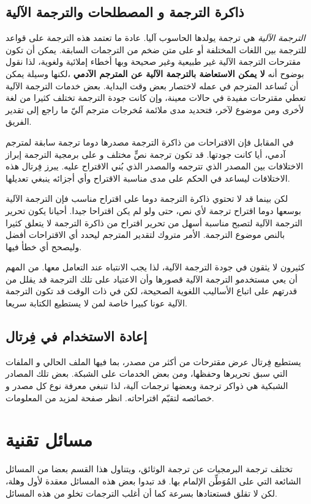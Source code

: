 \section{ذاكرة الترجمة و المصطلحات والترجمة الآلية}
{\it الترجمة الآلية} هي ترجمة يولدها الحاسوب آليا. عادة ما تعتمد هذه
الترجمة على قواعد للترجمة بين اللغات المختلفة أو على متن ضخم من
الترجمات السابقة. يمكن أن تكون مقترحات الترجمة الآلية غير طبيعية وغير
صحيحة وبها أخطاء إملائية ولغوية، لذا نقول بوضوح أنه {\bf لا يمكن
الاستعاضة بالترجمة الآلية عن المترجم الآدمي} ،لكنها وسيلة يمكن أن
تُساعد المترجم في عمله لاختصار بعض وقت البداية. بعض خدمات الترجمة
الآلية تعطي مقترحات مفيدة في حالات معينة، وإن كانت جودة الترجمة تختلف
كثيرا من لغة لأخرى ومن موضوع لآخر، فتحديد مدى ملائمة مُخرجات مترجم آليّ
ما راجع إلى تقدير الفريق.

في المقابل فإن الاقتراحات من ذاكرة الترجمة مصدرها دوما ترجمة سابقة
لمترجم آدمي، أيا كانت جودتها. قد تكون ترجمة نصٍّ مختلف و على برمجية
الترجمة إبراز الاختلافات بين المصدر الذي تترجمه والمصدر الذي بُني
الاقتراح عليه. يبرز فِرتال هذه الاختلافات ليساعد في الحكم على مدى
مناسبة الاقتراح وأي أجزائه ينبغي تعديلها.

لكن بينما قد لا تحتوي ذاكرة الترجمة دوما على اقتراح مناسب فإن الترجمة
الآلية بوسعها دوما اقتراح ترجمة لأي نص، حتى ولو لم يكن اقتراحا جيدا.
أحيانا يكون تحرير الترجمة الآلية لتصبح مناسبة أسهل من تحرير اقتراح من
ذاكرة الترجمة لا يتعلق كثيرا بالنص موضوع الترجمة. الأمر متروك لتقدير
المترجم ليحدد أي الاقتراحات أفضل وليصحح أي خطأ فيها.

كثيرون لا يثقون في جودة الترجمة الآلية، لذا يجب الانتباه عند التعامل
معها. من المهم أن يعي مستخدمو الترجمة الآلية قصورها وأن الاعتياد على
تلك الترجمة قد يقلل من قدرتهم على اتباع الأساليب اللغوية الصحيحة، لكن
في ذات الوقت قد تكون الترجمة الآلية عونا كبيرا خاصة لمن لا يستطيع
الكتابة سريعا.

\section{إعادة الاستخدام في فِرتال}
يستطيع فِرتال عرض مقترحات من أكثر من مصدر، بما فيها الملف الحالي و
الملفات التي سبق تحريرها وحفظها، ومن بعض الخدمات على الشبكة. بعض تلك
المصادر الشبكية هي ذواكر ترجمة وبعضها ترجمات آلية، لذا تنبغي معرفة نوع
كل مصدر و خصائصه لتقيّم اقتراحاته. انظر صفحة
\at[ref:36543315] لمزيد من المعلومات.

\chapter[ref:32352020]{مسائل تقنية}
تختلف ترجمة البرمجيات عن ترجمة
الوثائق، ويتناول هذا القسم بعضا من المسائل الشائعة التي على المُوَطِّن
الإلمام بها. قد تبدوا بعض هذه المسائل معقدة لأول وهلة، لكن لا تقلق
فستعتادها بسرعة كما أن أغلب الترجمات تخلو من هذه المسائل.

